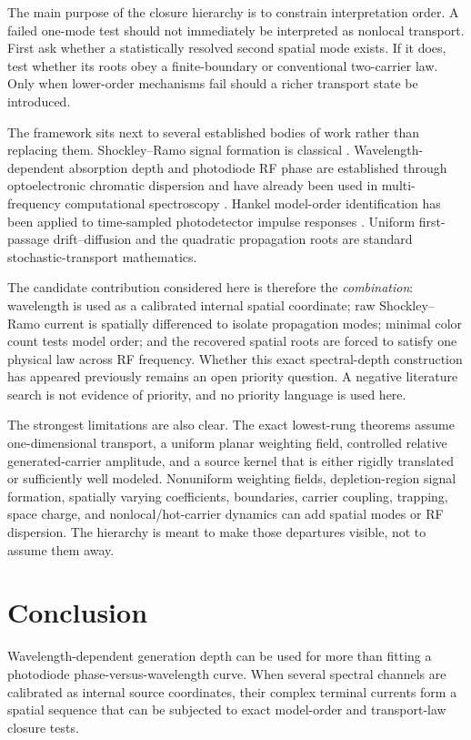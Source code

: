\documentclass[11pt]{article}
\begin{document}
The main purpose of the closure hierarchy is to constrain interpretation order. A failed one-mode test should not immediately be interpreted as nonlocal transport. First ask whether a statistically resolved second spatial mode exists. If it does, test whether its roots obey a finite-boundary or conventional two-carrier law. Only when lower-order mechanisms fail should a richer transport state be introduced.

The framework sits next to several established bodies of work rather than replacing them. Shockley--Ramo signal formation is classical \cite{Shockley1938,Ramo1939,Dabrowski1989}. Wavelength-dependent absorption depth and photodiode RF phase are established through optoelectronic chromatic dispersion \cite{Glasser2021} and have already been used in multi-frequency computational spectroscopy \cite{Kassa2026}. Hankel model-order identification has been applied to time-sampled photodetector impulse responses \cite{Sun2025}. Uniform first-passage drift--diffusion and the quadratic propagation roots are standard stochastic-transport mathematics.

The candidate contribution considered here is therefore the \emph{combination}: wavelength is used as a calibrated internal spatial coordinate; raw Shockley--Ramo current is spatially differenced to isolate propagation modes; minimal color count tests model order; and the recovered spatial roots are forced to satisfy one physical law across RF frequency. Whether this exact spectral-depth construction has appeared previously remains an open priority question. A negative literature search is not evidence of priority, and no priority language is used here.

The strongest limitations are also clear. The exact lowest-rung theorems assume one-dimensional transport, a uniform planar weighting field, controlled relative generated-carrier amplitude, and a source kernel that is either rigidly translated or sufficiently well modeled. Nonuniform weighting fields, depletion-region signal formation, spatially varying coefficients, boundaries, carrier coupling, trapping, space charge, and nonlocal/hot-carrier dynamics can add spatial modes or RF dispersion. The hierarchy is meant to make those departures visible, not to assume them away.

\section{Conclusion}

Wavelength-dependent generation depth can be used for more than fitting a photodiode phase-versus-wavelength curve. When several spectral channels are calibrated as internal source coordinates, their complex terminal currents form a spatial sequence that can be subjected to exact model-order and transport-law closure tests.
\end{document}
